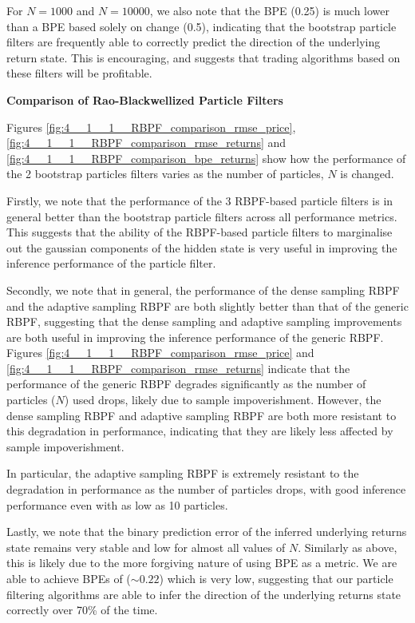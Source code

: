 \documentclass[../main.tex]{subfiles}
\begin{document}
For $N=1000$ and $N=10000$, we also note that the BPE (0.25) is much lower than a BPE based solely on change (0.5), indicating that the bootstrap particle filters are frequently able to correctly predict the direction of the underlying return state. This is encouraging, and suggests that trading algorithms based on these filters will be profitable.

\textbf{Comparison of Rao-Blackwellized Particle Filters}

Figures \ref{fig:4__1__1__RBPF_comparison_rmse_price}, \ref{fig:4__1__1__RBPF_comparison_rmse_returns} and \ref{fig:4__1__1__RBPF_comparison_bpe_returns} show how the performance of the 2 bootstrap particles filters varies as the number of particles, $N$ is changed. 

Firstly, we note that the performance of the 3 RBPF-based particle filters is in general better than the bootstrap particle filters across all performance metrics. This suggests that the ability of the RBPF-based particle filters to marginalise out the gaussian components of the hidden state is very useful in improving the inference performance of the particle filter. 

Secondly, we note that in general, the performance of the dense sampling RBPF and the adaptive sampling RBPF are both slightly better than that of the generic RBPF, suggesting that the dense sampling and adaptive sampling improvements are both useful in improving the inference performance of the generic RBPF. Figures \ref{fig:4__1__1__RBPF_comparison_rmse_price} and \ref{fig:4__1__1__RBPF_comparison_rmse_returns} indicate that the performance of the generic RBPF degrades significantly as the number of particles ($N$) used drops, likely due to sample impoverishment. However, the dense sampling RBPF and adaptive sampling RBPF are both more resistant to this degradation in performance, indicating that they are likely less affected by sample impoverishment. 

In particular, the adaptive sampling RBPF is extremely resistant to the degradation in performance as the number of particles drops, with good inference performance even with as low as 10 particles. 

Lastly, we note that the binary prediction error of the inferred underlying returns state remains very stable and low for almost all values of $N$. Similarly as above, this is likely due to the more forgiving nature of using BPE as a metric. We are able to achieve BPEs of ($\sim 0.22$) which is very low, suggesting that our particle filtering algorithms are able to infer the direction of the underlying returns state correctly over 70\% of the time. 
\end{document}
